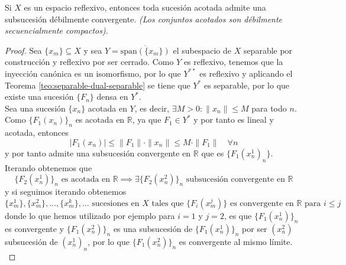 \begin{teo}[Eberlein]
    Si $X$ es un espacio reflexivo, entonces toda sucesión acotada admite una subsucesión débilmente convergente. \textit{\small(Los conjuntos acotados son débilmente secuencialmente compactos)}.

\begin{proof}
    Sea $\{x_m\} \subseteq X$ y sea $Y = \overline{\text{span}(\{x_m\})}$ el subespacio de $X$ separable por construcción y reflexivo por ser cerrado. Como $Y$ es reflexivo, tenemos que la inyección canónica
    es un isomorfismo, por lo que $Y^{**}$ es reflexivo y aplicando el Teorema \ref{teo:separable-dual-separable} se tiene que $Y^*$ es separable, por lo que existe una sucesión $\{F_n\}$ densa en $Y^*$. \\
    \noindent
    Sea una sucesión $\{x_n\}$ acotada en $Y$, es decir, $\exists M > 0 : \|x_n\| \le M$ para todo $n$. Como $\{F_1(x_n)\}_n$ es acotada en $\mathbb{R}$, ya que $F_1\in Y^*$ y por tanto es lineal y acotada, entonces
    \begin{equation*}
        |F_1(x_n)| \le \|F_1\| \cdot \|x_n\| \le M \cdot \|F_1\| \quad \forall n
    \end{equation*}
    y por tanto admite una subsucesión convergente en $\mathbb{R}$ que es $\{F_1(x_n^1)_n\}$. Iterando obtenemos que 
    \begin{equation*}
        \{F_2(x_n^1)\}_n \text{ es acotada en } \mathbb{R} \implies \exists \{F_2(x_n^2)\}_n \text{ subsucesión convergente en } \mathbb{R}
    \end{equation*}
    y si seguimos iterando obtenemos
    \begin{equation*}
        \{x_m^1\}, \{x_m^2\}, \dots, \{x_m^k\}, \dots \text{ sucesiones  en } X \text{ tales que } \{F_i(x_m^j)\} \text{ es convergente en } \mathbb{R} \text{ para } i \le j
    \end{equation*}
    donde lo que hemos utilizado por ejemplo para $i=1$ y $j=2$, es que $\{F_1(x_n^1)\}_n$ es convergente y $\{F_1(x_n^2)\}_n$ es una subsucesión de $\{F_1(x_n^1)\}_n$ por ser $(x_n^2)$ subsucesión de $(x_n^1)_n$, por lo que $\{F_1(x_n^2)\}_n$ es convergente al mismo límite. \\
    

\end{proof}
\end{teo}
